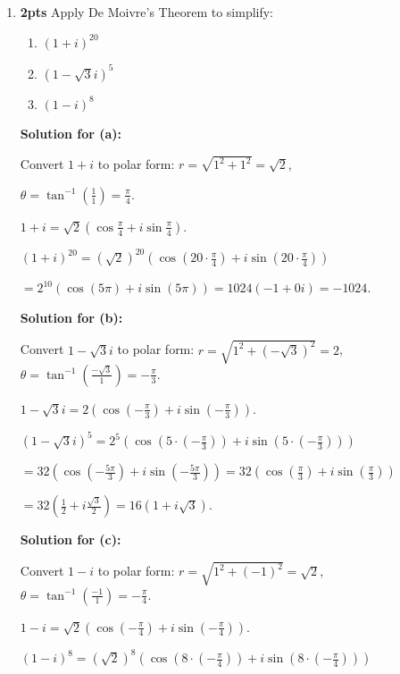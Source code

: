 \documentclass[nohyper,nobib,xcolor=dvipsnames,svgnames,x11names]{tufte-book}
\begin{document}
\begin{enumerate}
    Modulus: $|12+i5| = \sqrt{12^2+5^2} = \sqrt{144+25} = \sqrt{169} = 13$.
    
    \textbf{Solution for (b):}
    
    Complex conjugate: $-1-2\sqrt{2}i$.
    
    Modulus: $|-1+2\sqrt{2}i| = \sqrt{(-1)^2+(2\sqrt{2})^2} = \sqrt{1+8} = \sqrt{9}=3$.

    \item \textbf{2pts} Apply De Moivre's Theorem to simplify:
    \begin{enumerate}
        \item $(1+i)^{20}$
        \item $(1-\sqrt{3}i)^{5}$
        \item $(1-i)^{8}$
    \end{enumerate}

    \textbf{Solution for (a):}
    
    Convert $1+i$ to polar form: $r=\sqrt{1^2+1^2}=\sqrt{2}$, 
    
    $\theta=\tan^{-1}(\frac{1}{1})=\frac{\pi}{4}$.
    
    $1+i = \sqrt{2}(\cos\frac{\pi}{4}+i\sin\frac{\pi}{4})$.
    
    $(1+i)^{20} = (\sqrt{2})^{20}(\cos(20\cdot\frac{\pi}{4})+i\sin(20\cdot\frac{\pi}{4}))$
   
    $= 2^{10}(\cos(5\pi)+i\sin(5\pi)) = 1024(-1+0i) = -1024$.

    \textbf{Solution for (b):}

    Convert $1-\sqrt{3}i$ to polar form: $r=\sqrt{1^2+(-\sqrt{3})^2}=2$, $\theta=\tan^{-1}(\frac{-\sqrt{3}}{1})=-\frac{\pi}{3}$.
    
    $1-\sqrt{3}i = 2(\cos(-\frac{\pi}{3})+i\sin(-\frac{\pi}{3}))$.

    $(1-\sqrt{3}i)^5 = 2^5(\cos(5\cdot(-\frac{\pi}{3}))+i\sin(5\cdot(-\frac{\pi}{3})))$

    $= 32(\cos(-\frac{5\pi}{3})+i\sin(-\frac{5\pi}{3})) = 32(\cos(\frac{\pi}{3})+i\sin(\frac{\pi}{3}))$

    $= 32(\frac{1}{2}+i\frac{\sqrt{3}}{2}) = 16(1+i\sqrt{3})$.

    \textbf{Solution for (c):}
    
    Convert $1-i$ to polar form: $r=\sqrt{1^2+(-1)^2}=\sqrt{2}$, $\theta=\tan^{-1}(\frac{-1}{1})=-\frac{\pi}{4}$.

    $1-i = \sqrt{2}(\cos(-\frac{\pi}{4})+i\sin(-\frac{\pi}{4}))$.

    $(1-i)^8 = (\sqrt{2})^8(\cos(8\cdot(-\frac{\pi}{4}))+i\sin(8\cdot(-\frac{\pi}{4})))$


\end{enumerate}
\end{document}
